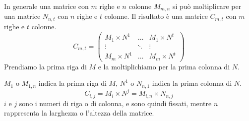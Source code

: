 In generale una matrice con $m$ righe e $n$ colonne $M_{m,n}$ si pu\`o moltiplicare per una matrice $N_{n,t}$ con $n$ righe e $t$ colonne. Il risultato \`e una matrice $C_{m,t}$ con $m$ righe e $t$ colonne.
\[
C_{m, t} =
\begin{pmatrix}
M_1 \times N^1 & \dots & M_1 \times N^t \\
\vdots & \ddots & \vdots \\
M_m \times N^1 & \dots & M_m \times N^t
\end{pmatrix}
\]
Prendiamo la prima riga di $M$ e la moltiplichiamo per la prima colonna di $N$.

$M_1$ o $M_{1,n}$ indica la prima riga di $M$, $N^1$ o $N_{n,1}$ indica la prima colonna di $N$.
\[
C_{i,j} = M_i \times N^j = M_{i,n} \times N_{n,j}
\]
$i$ e $j$ sono i numeri di riga o di colonna, e sono quindi fissati, mentre $n$ rappresenta la larghezza o l'altezza della matrice.

